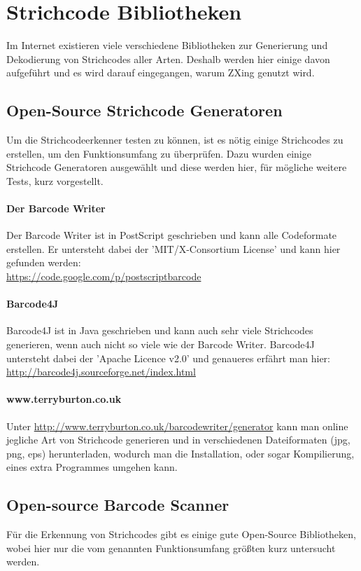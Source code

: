 \section{Strichcode Bibliotheken}
\writtenby{\dcauthornameriren}%
Im Internet existieren viele verschiedene Bibliotheken zur Generierung und Dekodier\-ung von Strichcodes aller Arten. Deshalb werden hier einige davon aufgeführt und es wird darauf eingegangen, warum ZXing genutzt wird.


\subsection*{Open-Source Strichcode Generatoren}
Um die Strichcodeerkenner testen zu können, ist es nötig einige Strichcodes zu erstellen, um den Funktionsumfang zu überprüfen. Dazu wurden einige Strichcode Generatoren ausgewählt und diese werden hier, für mögliche weitere Tests, kurz vorgestellt.

\paragraph*{Der Barcode Writer}
Der Barcode Writer ist in PostScript geschrieben und kann alle Codeformate erstellen. Er untersteht dabei der 'MIT/X-Consortium License' und kann hier gefunden werden:\\ \url{https://code.google.com/p/postscriptbarcode}

\paragraph*{Barcode4J}
Barcode4J ist in Java geschrieben und kann auch sehr viele Strichcodes generieren, wenn auch nicht so viele wie der Barcode Writer. Barcode4J untersteht dabei der 'Apache Licence v2.0' und genaueres erfährt man hier:\\
\url{http://barcode4j.sourceforge.net/index.html}

\paragraph*{www.terryburton.co.uk}
Unter \url{http://www.terryburton.co.uk/barcodewriter/generator} kann man online jegliche Art von Strichcode generieren und in verschiedenen Dateiformaten (jpg, png, eps) herunterladen, wodurch man die Installation, oder sogar Kompilierung, eines extra Programmes umgehen kann.



\subsection*{Open-source Barcode Scanner}
Für die Erkennung von Strichcodes gibt es einige gute Open-Source Bibliotheken, wobei hier nur die vom genannten Funktionsumfang größten kurz untersucht werden.

